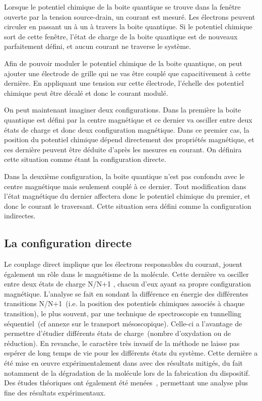 Lorsque le potentiel chimique de la boite quantique se trouve dans la fen\^etre ouverte par la tension source-drain, un courant est mesuré. Les électrons peuvent circuler en passant un à un à travers la boite quantique. Si le potentiel chimique sort de cette fen\^etre, l'état de charge de la boite quantique est de nouveaux parfaitement défini, et aucun courant ne traverse le système.

Afin de pouvoir moduler le potentiel chimique de la boite quantique, on peut ajouter une électrode de grille qui ne vas être couplé que capacitivement à cette dernière. En appliquant une tension sur cette électrode, l'échelle des potentiel chimique peut être décalé et donc le courant modulé. 

On peut maintenant imaginer deux configurations. Dans la première la boite quantique est défini par la centre magnétique et ce dernier va osciller entre deux états de charge et donc deux configuration magnétique. Dans ce premier cas, la position du potentiel chimique dépend directement des propriétés magnétique, et ces dernière peuvent être déduite d'après les mesures en courant. On définira cette situation comme étant la configuration directe. 

Dans la deuxième configuration, la boite quantique n'est pas confondu avec le centre magnétique mais seulement couplé à ce dernier. Tout modification dans l'état magnétique du dernier affectera donc le potentiel chimique du premier, et donc le courant le traversant. Cette situation sera défini comme la configuration indirectes.


\subsection{La configuration directe}
Le couplage direct implique que les électrons responsables du courant, jouent également un rôle dans le magnétisme de la molécule. Cette dernière va osciller entre deux états de charge N/N+1 , chacun d'eux ayant sa propre configuration magnétique. L'analyse se fait en sondant la différence en énergie des différentes transitions N/N+1~(i.e. la position des potentiels chimiques associés à chaque transition), le plus souvent, par une technique de spectroscopie en tunnelling séquentiel~(cf annexe sur le transport mésoscopique). Celle-ci a l'avantage de permettre d'étudier différents états de charge~(nombre d'oxydation ou de réduction). En revanche, le caractère très invasif de la méthode ne laisse pas espérer de long temps de vie pour les différents états du système. Cette dernière a été mise en œuvre expérimentalement dans \cite{Heersche2006,Jo2006,Zyazin2010} avec des résultats mitigés, du fait notamment de la dégradation de la molécule lors de la fabrication du dispositif. Des études théoriques ont également été menées~\cite{Timm2006,Timm2007}, permettant une analyse plus fine des résultats expérimentaux.

